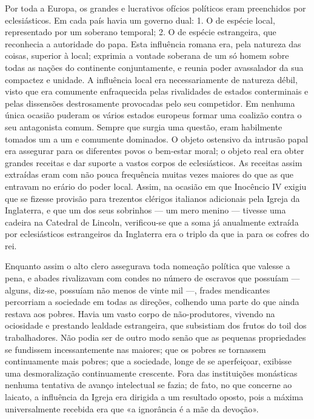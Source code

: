 \documentclass[11pt,a5paper,twoside,openany]{book}
\begin{document}
Por toda a Europa, os grandes e lucrativos ofícios políticos eram preenchidos por eclesiásticos. Em cada país havia um governo dual: 1. O de espécie local, representado por um soberano temporal; 2. O de espécie estrangeira, que reconhecia a autoridade do papa. Esta influência romana era, pela natureza das coisas, superior à local; exprimia a vontade soberana de um só homem sobre todas as nações do continente conjuntamente, e reunia poder avassalador da sua compactez e unidade. A influência local era necessariamente de natureza débil, visto que era comumente enfraquecida pelas rivalidades de estados conterminais e pelas dissensões destrosamente provocadas pelo seu competidor. Em nenhuma única ocasião puderam os vários estados europeus formar uma coalizão contra o seu antagonista comum. Sempre que surgia uma questão, eram habilmente tomados um a um e comumente dominados. O objeto ostensivo da intrusão papal era assegurar para os diferentes povos o bem-estar moral; o objeto real era obter grandes receitas e dar suporte a vastos corpos de eclesiásticos. As receitas assim extraídas eram com não pouca frequência muitas vezes maiores do que as que entravam no erário do poder local. Assim, na ocasião em que Inocêncio IV exigiu que se fizesse provisão para trezentos clérigos italianos adicionais pela Igreja da Inglaterra, e que um dos seus sobrinhos — um mero menino — tivesse uma cadeira na Catedral de Lincoln, verificou-se que a soma já anualmente extraída por eclesiásticos estrangeiros da Inglaterra era o triplo da que ia para os cofres do rei.

Enquanto assim o alto clero assegurava toda nomeação política que valesse a pena, e abades rivalizavam com condes no número de escravos que possuíam — alguns, diz-se, possuíam não menos de vinte mil —, frades mendicantes percorriam a sociedade em todas as direções, colhendo uma parte do que ainda restava aos pobres. Havia um vasto corpo de não-produtores, vivendo na ociosidade e prestando lealdade estrangeira, que subsistiam dos frutos do toil dos trabalhadores. Não podia ser de outro modo senão que as pequenas propriedades se fundissem incessantemente nas maiores; que os pobres se tornassem continuamente mais pobres; que a sociedade, longe de se aperfeiçoar, exibisse uma desmoralização continuamente crescente. Fora das instituições monásticas nenhuma tentativa de avanço intelectual se fazia; de fato, no que concerne ao laicato, a influência da Igreja era dirigida a um resultado oposto, pois a máxima universalmente recebida era que «a ignorância é a mãe da devoção».
\end{document}
